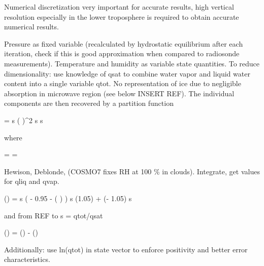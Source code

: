         Numerical discretization very important for accurate results, high
        vertical resolution especially in the lower troposphere is required to
        obtain accurate numerical results.

    \stopsubsection

    \startsubsection[title=The Choice of State Vector Variables]

        Pressure as fixed variable (recalculated by hydrostatic equilibrium
        after each iteration, check if this is good approximation when compared
        to radiosonde measurements). Temperature and humidity as variable
        state quantities. To reduce dimensionality: use knowledge of qsat to
        combine water vapor and liquid water content into a single variable
        qtot. No representation of ice due to negligible absorption in
        microwave region (see below INSERT REF). The individual components are
        then recovered by a partition function

        \startformula
            \DERIV{\QLIQ}{\RHL} = \QSAT \startcases
                 \MC s  \NR
                \NC \cos \left(   \right)^2
                     \le s  \EQCOMMA\NR
                  \lt s \NR
            \stopcases
        \stopformula

        where

        \startformula
            \RHL = \frac{\QTOT}{\QSAT} = \frac{\QVAP + \QLIQ}{\QSAT} \EQSTOP
        \stopformula

        Hewison, Deblonde, (COSMO7 fixes RH at 100 \% in clouds). Integrate,
        get values for qliq and qvap.

        \startformula
            \QLIQ(\RHL) = \startcases
                 \MC s  \NR
                \NC {} \left( \RHL - 0.95 - 
                    \cos \left(  \right) \right)
                     \le s  \NR
                \NC \QLIQ(1.05) + \QSAT (\RHL - 1.05)  \lt s \NR
            \stopcases
        \stopformula

        and from REF to s = qtot/qsat

        \startformula
            \QVAP(\RHL) = \QTOT(\RHL) - \QLIQ(\RHL) \EQSTOP
        \stopformula

        Additionally: use ln(qtot) in state vector to enforce positivity and
        better error characteristics.

